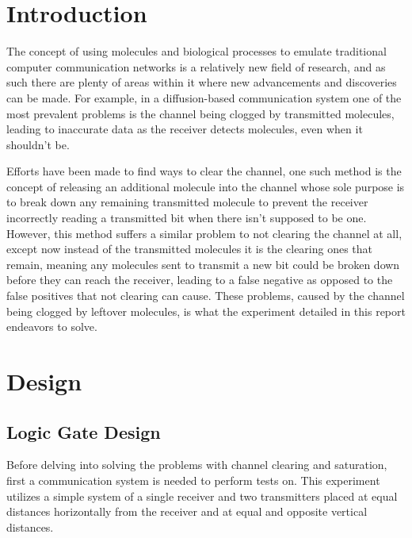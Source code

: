 \documentclass[conference]{IEEEtran}
\begin{document}
\section{Introduction}

The concept of using molecules and biological processes to emulate traditional computer communication networks is a relatively new field of research, and as such there are plenty of areas within it where new advancements and discoveries can be made. For example, in a diffusion-based communication system one of the most prevalent problems is the channel being clogged by transmitted molecules, leading to inaccurate data as the receiver detects molecules, even when it shouldn’t be.
\\
\par
Efforts have been made to find ways to clear the channel, one such method is the concept of releasing an additional molecule into the channel whose sole purpose is to break down any remaining transmitted molecule to prevent the receiver incorrectly reading a transmitted bit when there isn’t supposed to be one. However, this method suffers a similar problem to not clearing the channel at all, except now instead of the transmitted molecules it is the clearing ones that remain, meaning any molecules sent to transmit a new bit could be broken down before they can reach the receiver, leading to a false negative as opposed to the false positives that not clearing can cause. These problems, caused by the channel being clogged by leftover molecules, is what the experiment detailed in this report endeavors to solve.

\section{Design}

\subsection{Logic Gate Design}
Before delving into solving the problems with channel clearing and saturation, first a communication system is needed to perform tests on. This experiment utilizes a simple system of a single receiver and two transmitters placed at equal distances horizontally from the receiver and at equal and opposite vertical distances.
\end{document}

